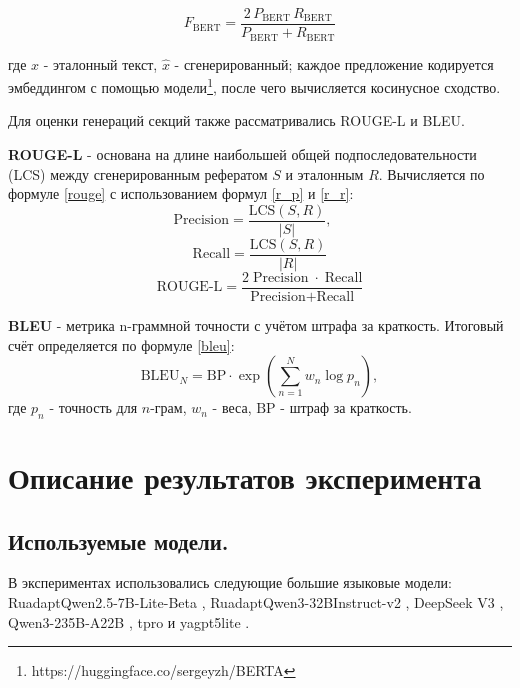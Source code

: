 \documentclass{article}
\begin{document}
\begin{equation}\label{f}
F_{\mathrm{BERT}}= \frac{2\,P_{\mathrm{BERT}}\,R_{\mathrm{BERT}}}{P_{\mathrm{BERT}} + R_{\mathrm{BERT}}}
\end{equation}

где \(x\) - эталонный текст, \(\hat{x}\) - сгенерированный; каждое предложение кодируется эмбеддингом с помощью модели\footnote{https://huggingface.co/sergeyzh/BERTA}, после чего вычисляется косинусное сходство.  

Для оценки генераций секций также рассматривались ROUGE-\allowbreak L и BLEU.

\textbf{ROUGE-L} \cite{rouge} - основана на длине наибольшей общей подпоследовательности (LCS) между сгенерированным рефератом $S$ и эталонным $R$.
Вычисляется по формуле \eqref{rouge} с использованием формул \eqref{r_p} и \eqref{r_r}:
\begin{equation}\label{r_p}
  \text{Precision} = \frac{\mathrm{LCS}(S,R)}{|S|},\quad
\end{equation}
\begin{equation}\label{r_r}
  \text{Recall} = \frac{\mathrm{LCS}(S,R)}{|R|}
\end{equation}
\begin{equation}\label{rouge}
  \text{ROUGE‑L} = \frac{2\;\text{Precision}\;\cdot\;\text{Recall}}{\text{Precision} + \text{Recall}}
\end{equation}

\textbf{BLEU} \cite{bleu} - метрика n-граммной точности с учётом штрафа за краткость. Итоговый счёт определяется по формуле \eqref{bleu}:
\begin{equation}\label{bleu}
\mathrm{BLEU}_N = \mathrm{BP}\cdot \exp\!\left(\sum_{n=1}^{N} w_n \log p_n\right),
\end{equation}
где \(p_n\) - точность для \(n\)-грам, \(w_n\) - веса, $\mathrm{BP}$ - штраф за краткость.

\section*{Описание результатов эксперимента}
\subsection*{Используемые модели.}
В экспериментах использовались следующие большие языковые модели: 
RuadaptQwen2.5-\allowbreak 7B-\allowbreak Lite-\allowbreak Beta \cite{ruadapt},
RuadaptQwen3-\allowbreak 32BInstruct-v2 \cite{ruadapt}, 
DeepSeek V3 \cite{deepseek}, 
Qwen3-\allowbreak 235B-\allowbreak A22B \cite{qwen3}, 
tpro \cite{tpro} и yagpt5lite \cite{yagpt}.
\end{document}
